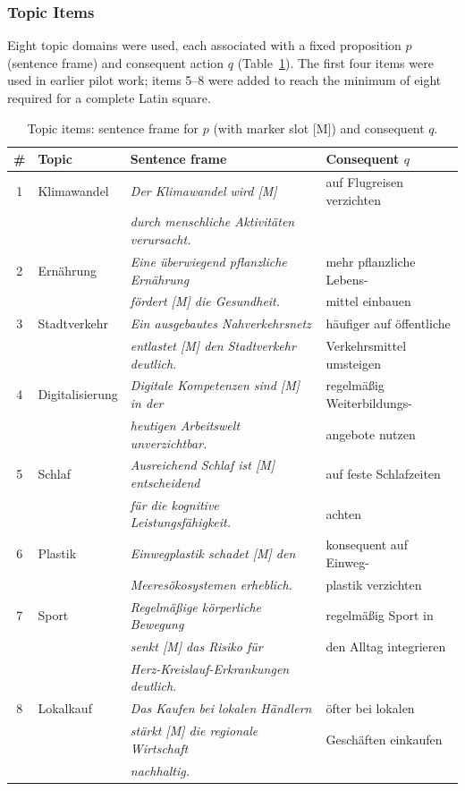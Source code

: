 \documentclass[12pt]{article}
\begin{document}
\subsubsection{Topic Items}

Eight topic domains were used, each associated with a fixed proposition
$p$ (sentence frame) and consequent action $q$ (Table~\ref{tab:items}).
The first four items were used in earlier pilot work; items 5--8 were
added to reach the minimum of eight required for a complete Latin square.

\begin{table}[ht]
\centering
\caption{Topic items: sentence frame for $p$ (with marker slot [M]) and consequent $q$.}
\label{tab:items}
\small
\begin{tabular}{clll}
\toprule
\textbf{\#} & \textbf{Topic} & \textbf{Sentence frame} & \textbf{Consequent $q$} \\
\midrule
1 & Klimawandel &
  \textit{Der Klimawandel wird [M]} &
  auf Flugreisen verzichten \\
  & & \textit{durch menschliche Aktivit\"aten verursacht.} & \\[3pt]
2 & Ern\"ahrung &
  \textit{Eine \"uberwiegend pflanzliche Ern\"ahrung} &
  mehr pflanzliche Lebens- \\
  & & \textit{f\"ordert [M] die Gesundheit.} &
  mittel einbauen \\[3pt]
3 & Stadtverkehr &
  \textit{Ein ausgebautes Nahverkehrsnetz} &
  h\"aufiger auf \"offentliche \\
  & & \textit{entlastet [M] den Stadtverkehr deutlich.} &
  Verkehrsmittel umsteigen \\[3pt]
4 & Digitalisierung &
  \textit{Digitale Kompetenzen sind [M] in der} &
  regelm\"a\ss{}ig Weiterbildungs- \\
  & & \textit{heutigen Arbeitswelt unverzichtbar.} &
  angebote nutzen \\[3pt]
5 & Schlaf &
  \textit{Ausreichend Schlaf ist [M] entscheidend} &
  auf feste Schlafzeiten \\
  & & \textit{f\"ur die kognitive Leistungsf\"ahigkeit.} &
  achten \\[3pt]
6 & Plastik &
  \textit{Einwegplastik schadet [M] den} &
  konsequent auf Einweg- \\
  & & \textit{Meeres\"okosystemen erheblich.} &
  plastik verzichten \\[3pt]
7 & Sport &
  \textit{Regelm\"a\ss{}ige k\"orperliche Bewegung} &
  regelm\"a\ss{}ig Sport in \\
  & & \textit{senkt [M] das Risiko f\"ur} &
  den Alltag integrieren \\
  & & \textit{Herz-Kreislauf-Erkrankungen deutlich.} & \\[3pt]
8 & Lokalkauf &
  \textit{Das Kaufen bei lokalen H\"andlern} &
  \"ofter bei lokalen \\
  & & \textit{st\"arkt [M] die regionale Wirtschaft} &
  Gesch\"aften einkaufen \\
  & & \textit{nachhaltig.} & \\
\bottomrule
\end{tabular}
\end{table}
\end{document}
